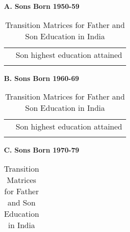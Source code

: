 \begin{table}[H]
  \caption{Transition Matrices for Father and Son Education in India}
\vspace{-.5cm}
  \label{tab:trans_matrices}
        {\scriptsize

          \begin{center}
            \textbf{A. Sons Born 1950-59} 
          \end{center}

          \begin{center}
            \begin{tabular}{c |c c c c c c c}
              \hline
              \hline
              & \multicolumn{7}{c}{Son highest education attained} \\
              \tiny  
              \hline
              \tiny  
              \hline 


            \end{tabular}
          \end{center}


          \begin{center}
            \textbf{B. Sons Born 1960-69} 

          \end{center}

          \begin{center}
            \begin{tabular}{c |c c c c c c c}

              \hline
              \hline
              & \multicolumn{7}{c}{Son highest education attained} \\
              \tiny  
              \hline
              \tiny  
              \hline 
            \end{tabular}
          \end{center}

          \begin{center}
            \textbf{C. Sons Born 1970-79} 
          \end{center}

          \begin{center}
            \begin{tabular}{c |c c c c c c c}


\end{tabular}
\end{center}}
\end{table}
